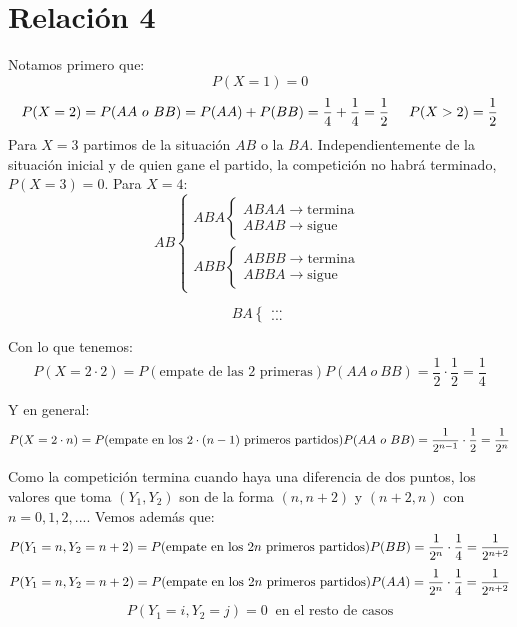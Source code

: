 \documentclass[openany]{book}
\begin{document}
\chapter{Relación 4}

\begin{exercise}
    Notamos primero que:
    $$ P(X=1) = 0 $$
    $$ P(X=2) = P (AA\ o\ BB) = P(AA) + P(BB) = \dfrac{1}{4} + \dfrac{1}{4} = \dfrac{1}{2} \hspace{5mm} P(X>2) = \dfrac{1}{2} $$
    Para $ X=3 $ partimos de la situación $ AB $ o la $ BA $. Independientemente de la situación inicial y de quien gane el partido, la competición no habrá terminado, $ P(X=3) = 0 $. Para $ X=4 $:
    $$ AB \left\{
    \begin{array}{l}
        ABA \left\{
        \begin{array}{l}
            ABAA \to \text{termina}\\
            ABAB \to \text{sigue}
        \end{array}
        \right.\\
        ABB \left\{
        \begin{array}{l}
            ABBB\to \text{termina}\\
            ABBA \to \text{sigue}
        \end{array}
        \right.
    \end{array}
    \right.    
$$

$$ BA \left\{
\begin{array}{l}
    ...\\ 
    ...
\end{array}
\right. $$

Con lo que tenemos:
$$ P(X=2\cdot 2) = P(\text{empate de las 2 primeras})P(AA\ o\ BB) = \dfrac{1}{2} \cdot \dfrac{1}{2} = \dfrac{1}{4} $$

Y en general:
$$ P(X=2\cdot n) = P(\text{empate en los $ 2\cdot (n-1) $ primeros partidos})P(AA\ o\ BB) = \dfrac{1}{2^{n-1}}\cdot \dfrac{1}{2} = \dfrac{1}{2^{n}} $$

Como la competición termina cuando haya una diferencia de dos puntos, los valores que toma $ (Y_1,Y_2) $ son de la forma $ (n,n+2) $ y $ (n+2,n) $ con $ n = 0,1,2,... $. Vemos además que:
$$ P(Y_1=n,Y_2=n+2) = P(\text{empate en los $ 2n $ primeros partidos})P(BB) = \dfrac{1}{2^{n}}\cdot \dfrac{1}{4} = \dfrac{1}{2^{n+2}} $$
$$ P(Y_1=n,Y_2=n+2) = P(\text{empate en los $ 2n $ primeros partidos})P(AA) = \dfrac{1}{2^{n}}\cdot \dfrac{1}{4} = \dfrac{1}{2^{n+2}} $$
$$ P(Y_1=i,Y_2=j) = 0\ \text{ en el resto de casos} $$


\end{exercise}
\end{document}
